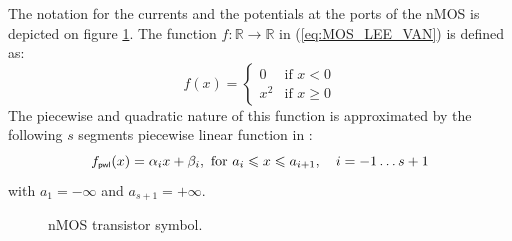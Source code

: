 The notation for the currents and the potentials at the ports of the nMOS is depicted on figure \ref{fig:NMOS}. The function $f :\mathbb{R} \longrightarrow \mathbb{R}$ in (\ref{eq:MOS_LEE_VAN}) is defined as:
\[
f(x) = \left\{ \begin{array}{ll}
0 & \textrm{if $x < 0$}\\
x^2 & \textrm{if $x \geq 0$}
\end{array} \right.
\]
The piecewise and quadratic nature of this function is approximated by the following $s$ segments piecewise linear function in \cite{leenaerts-bokhoven1998}: 
\begin{equation}\label{eq:pwl}
  f_\pwl(x) = \alpha_i x + \beta_i, \text{ for } a_i \leq x \leq a_{i+1}, \quad i = -1\ldots s+1
\end{equation}
with $a_1 = -\infty$ and $a_{s+1} = +\infty$.
\begin{figure}
  \centering
  
  \caption{nMOS transistor symbol.}
  \label{fig:NMOS}
\end{figure}

